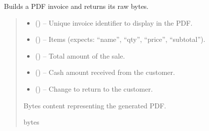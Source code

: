 \documentclass[a4paper,11pt,spanish]{sphinxmanual}
\begin{document}
\begin{fulllineitems}
\label{\detokenize{api/sale/sale.services:sale.services.build_invoice_pdf}}
\pysigstartsignatures
\pysiglinewithargsret
{}
{\sphinxparamcomma {}\sphinxparamcomma {}\sphinxparamcomma {}\sphinxparamcomma {}}
{}
\pysigstopsignatures
\sphinxAtStartPar
Builds a PDF invoice and returns its raw bytes.
\begin{quote}\begin{description}
\begin{itemize}
\item {} 
\sphinxAtStartPar
{} () – Unique invoice identifier to display in the PDF.

\item {} 
\sphinxAtStartPar
{} (\sphinxstyleliteralemphasis{\sphinxupquote{{[}}}\sphinxstyleliteralemphasis{\sphinxupquote{{]}}}) – Items (expects: “name”, “qty”, “price”, “subtotal”).

\item {} 
\sphinxAtStartPar
{} () – Total amount of the sale.

\item {} 
\sphinxAtStartPar
{} () – Cash amount received from the customer.

\item {} 
\sphinxAtStartPar
{} () – Change to return to the customer.

\end{itemize}

\sphinxAtStartPar
Bytes content representing the generated PDF.

\sphinxAtStartPar
bytes

\end{description}\end{quote}

\end{fulllineitems}
\end{document}
